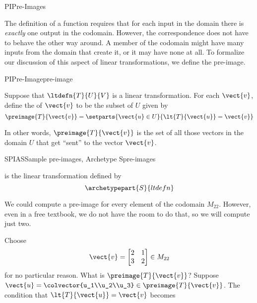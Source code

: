 %
\begin{subsect}{PI}{Pre-Images}
%
\begin{para}The definition of a function requires that for each input in the domain there is {\em exactly} one output in the codomain.  However, the correspondence does not have to behave the other way around.  A member of the codomain might have many inputs from the domain that create it, or it may have none at all.  To formalize our discussion of this aspect of linear transformations, we define the pre-image.\end{para}
%
\begin{definition}{PI}{Pre-Image}{pre-image}
\begin{para}Suppose that $\ltdefn{T}{U}{V}$ is a linear transformation.  For each $\vect{v}$, define the  of $\vect{v}$ to be the subset of $U$ given by
%
\begin{equation*}
\preimage{T}{\vect{v}}=\setparts{\vect{u}\in U}{\lt{T}{\vect{u}}=\vect{v}}
\end{equation*}
\end{para}
%
\end{definition}
%
\begin{para}In other words, $\preimage{T}{\vect{v}}$ is the set of all those vectors in the domain $U$ that get ``sent'' to the vector $\vect{v}$.\end{para}
%
%
%
\begin{example}{SPIAS}{Sample pre-images, Archetype S}{pre-images}
\begin{para} is the linear transformation defined by
%
\begin{equation*}
\archetypepart{S}{ltdefn}\end{equation*}
\end{para}
%
\begin{para}We could compute a pre-image for every element of the codomain $M_{22}$.  However, even in a free textbook, we do not have the room to do that, so we will compute just two.\end{para}
%
\begin{para}Choose
%
\begin{equation*}
\vect{v}=
\begin{bmatrix}
2&1\\3&2
\end{bmatrix}
\in M_{22}
\end{equation*}
%
for no particular reason.  What is $\preimage{T}{\vect{v}}$?  Suppose $\vect{u}=\colvector{u_1\\u_2\\u_3}\in\preimage{T}{\vect{v}}$.  The condition that $\lt{T}{\vect{u}}=\vect{v}$ becomes

\end{para}
\end{example}
\end{subsect}
